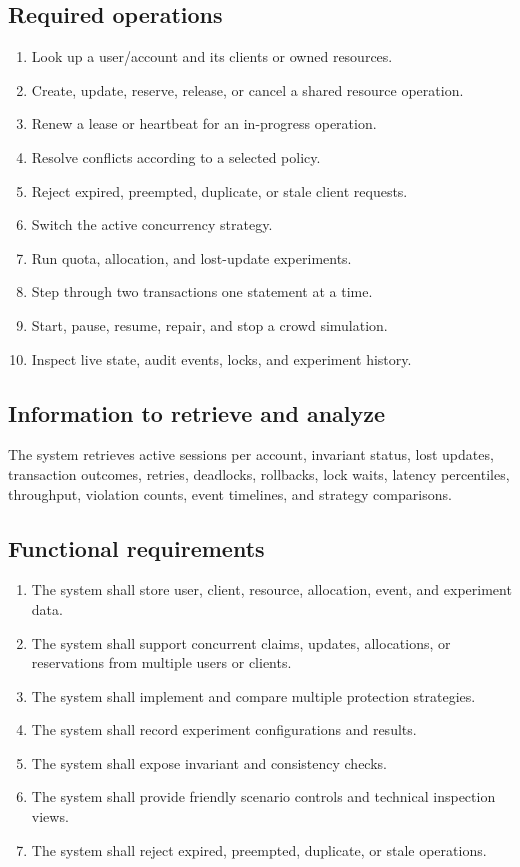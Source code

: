 \documentclass[12pt,a4paper]{article}
\begin{document}
\subsection{Required operations}
\begin{enumerate}
\item Look up a user/account and its clients or owned resources.
\item Create, update, reserve, release, or cancel a shared resource operation.
\item Renew a lease or heartbeat for an in-progress operation.
\item Resolve conflicts according to a selected policy.
\item Reject expired, preempted, duplicate, or stale client requests.
\item Switch the active concurrency strategy.
\item Run quota, allocation, and lost-update experiments.
\item Step through two transactions one statement at a time.
\item Start, pause, resume, repair, and stop a crowd simulation.
\item Inspect live state, audit events, locks, and experiment history.
\end{enumerate}

\subsection{Information to retrieve and analyze}

The system retrieves active sessions per account, invariant status, lost updates, transaction outcomes, retries, deadlocks, rollbacks, lock waits, latency percentiles, throughput, violation counts, event timelines, and strategy comparisons.

\subsection{Functional requirements}
\begin{enumerate}
\item The system shall store user, client, resource, allocation, event, and experiment data.
\item The system shall support concurrent claims, updates, allocations, or reservations from multiple users or clients.
\item The system shall implement and compare multiple protection strategies.
\item The system shall record experiment configurations and results.
\item The system shall expose invariant and consistency checks.
\item The system shall provide friendly scenario controls and technical inspection views.
\item The system shall reject expired, preempted, duplicate, or stale operations.
\end{enumerate}
\end{document}

